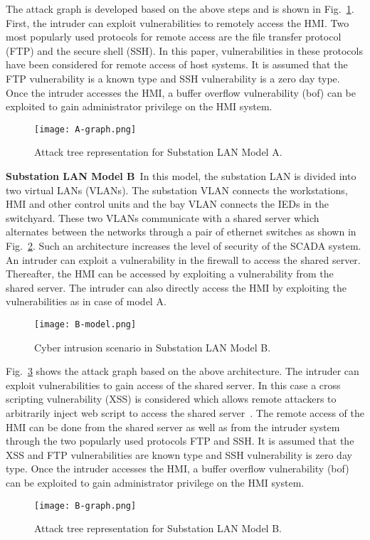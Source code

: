 The attack graph is developed based on the above steps and is shown in Fig.~\ref{fig:graph-A}. First, the intruder can exploit vulnerabilities to remotely access the HMI. Two most popularly used protocols for remote access are the file transfer protocol (FTP) and the secure shell (SSH). In this paper, vulnerabilities in these protocols have been considered for remote access of host systems. It is assumed that the FTP vulnerability is a known type and SSH vulnerability is a zero day type. Once the intruder accesses the HMI, a buffer overflow vulnerability (bof) can be exploited to gain administrator privilege on the HMI system.
\begin{figure}[htbp]
	\centering
	\texttt{[image: A-graph.png]}
	\caption{Attack tree representation for Substation LAN Model A.}
	\label{fig:graph-A}
\end{figure}

\noindent\textbf{Substation LAN Model B}\ 
In this model, the substation LAN is divided into two virtual LANs (VLANs). The substation VLAN connects the workstations, HMI and other control units and the bay VLAN connects the IEDs in the switchyard. These two VLANs communicate with a shared server which alternates between the networks through a pair of ethernet switches as shown in Fig.~\ref{fig:model-B}. Such an architecture increases the level of security of the SCADA system. An intruder can exploit a vulnerability in the firewall to access the shared server. Thereafter, the HMI can be accessed by exploiting a vulnerability from the shared server. The intruder can also directly access the HMI by exploiting the vulnerabilities as in case of model A.
\begin{figure}[htbp]
	\centering
	\texttt{[image: B-model.png]}
	\caption{Cyber intrusion scenario in Substation LAN Model B.}
	\label{fig:model-B}
\end{figure}

Fig.~\ref{fig:graph-B} shows the attack graph based on the above architecture. The intruder can exploit vulnerabilities to gain access of the shared server. In this case a cross scripting vulnerability (XSS) is considered which allows remote attackers to arbitrarily inject web script to access the shared server~\cite{ftp}. The remote access of the HMI can be done from the shared server as well as from the intruder system through the two popularly used protocols FTP and SSH. It is assumed that the XSS and FTP vulnerabilities are known type and SSH vulnerability is zero day type. Once the intruder accesses the HMI, a buffer overflow vulnerability (bof) can be exploited to gain administrator privilege on the HMI system.
\begin{figure}[htbp]
	\centering
	\texttt{[image: B-graph.png]}
	\caption{Attack tree representation for Substation LAN Model B.}
	\label{fig:graph-B}
\end{figure}


